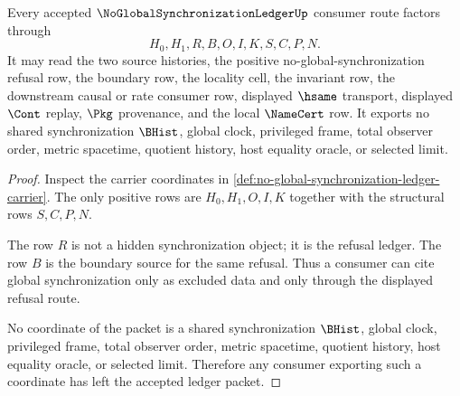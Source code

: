 \begin{theorem}
\label{thm:no-global-synchronization-ledger-consumer-nonescape}
Every accepted $\NoGlobalSynchronizationLedgerUp$ consumer route factors through
$$
H_0,H_1,R,B,O,I,K,S,C,P,N.
$$
It may read the two source histories, the positive no-global-synchronization refusal row, the boundary row, the locality cell, the invariant row, the downstream causal or rate consumer row, displayed $\hsame$ transport, displayed $\Cont$ replay, $\Pkg$ provenance, and the local $\NameCert$ row. It exports no shared synchronization $\BHist$, global clock, privileged frame, total observer order, metric spacetime, quotient history, host equality oracle, or selected limit.
\end{theorem}
\begin{proof}
Inspect the carrier coordinates in \autoref{def:no-global-synchronization-ledger-carrier}. The only positive rows are $H_0,H_1,O,I,K$ together with the structural rows $S,C,P,N$.

The row $R$ is not a hidden synchronization object; it is the refusal ledger. The row $B$ is the boundary source for the same refusal. Thus a consumer can cite global synchronization only as excluded data and only through the displayed refusal route.

No coordinate of the packet is a shared synchronization $\BHist$, global clock, privileged frame, total observer order, metric spacetime, quotient history, host equality oracle, or selected limit. Therefore any consumer exporting such a coordinate has left the accepted ledger packet.
\end{proof}

